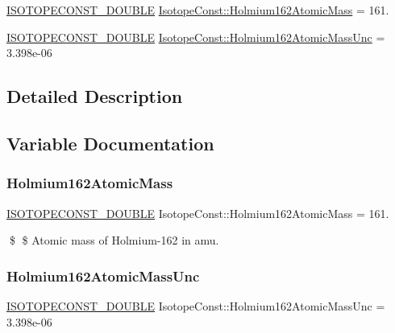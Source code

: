 \begin{DoxyCompactItemize}
\item 
\mbox{\hyperlink{group___isotope_const-_macros_ga8f45a7272ce02c0b4c65c44636ed719a}{I\+S\+O\+T\+O\+P\+E\+C\+O\+N\+S\+T\+\_\+\+D\+O\+U\+B\+LE}} \mbox{\hyperlink{group___isotope_const-_holmium-_ho162_ga5f94dcdf3741ca47ba6f794df8325bad}{Isotope\+Const\+::\+Holmium162\+Atomic\+Mass}} = 161.
\item 
\mbox{\hyperlink{group___isotope_const-_macros_ga8f45a7272ce02c0b4c65c44636ed719a}{I\+S\+O\+T\+O\+P\+E\+C\+O\+N\+S\+T\+\_\+\+D\+O\+U\+B\+LE}} \mbox{\hyperlink{group___isotope_const-_holmium-_ho162_gae19e5b5606c412a55c79c22ca332dacb}{Isotope\+Const\+::\+Holmium162\+Atomic\+Mass\+Unc}} = 3.\+398e-\/06
\end{DoxyCompactItemize}


\subsection{Detailed Description}


\subsection{Variable Documentation}
\mbox{\label{group___isotope_const-_holmium-_ho162_ga5f94dcdf3741ca47ba6f794df8325bad}} 
\subsubsection{\texorpdfstring{Holmium162\+Atomic\+Mass}{Holmium162AtomicMass}}
{\footnotesize\ttfamily \mbox{\hyperlink{group___isotope_const-_macros_ga8f45a7272ce02c0b4c65c44636ed719a}{I\+S\+O\+T\+O\+P\+E\+C\+O\+N\+S\+T\+\_\+\+D\+O\+U\+B\+LE}} Isotope\+Const\+::\+Holmium162\+Atomic\+Mass = 161.}

\$ \$ Atomic mass of Holmium-\/162 in amu. \mbox{\label{group___isotope_const-_holmium-_ho162_gae19e5b5606c412a55c79c22ca332dacb}} 
\subsubsection{\texorpdfstring{Holmium162\+Atomic\+Mass\+Unc}{Holmium162AtomicMassUnc}}
{\footnotesize\ttfamily \mbox{\hyperlink{group___isotope_const-_macros_ga8f45a7272ce02c0b4c65c44636ed719a}{I\+S\+O\+T\+O\+P\+E\+C\+O\+N\+S\+T\+\_\+\+D\+O\+U\+B\+LE}} Isotope\+Const\+::\+Holmium162\+Atomic\+Mass\+Unc = 3.\+398e-\/06}

